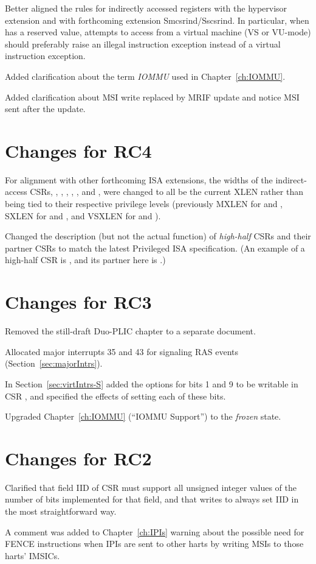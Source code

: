 Better aligned the rules for indirectly accessed registers with the
hypervisor extension and with forthcoming extension Smcsrind/Sscsrind.
In particular, when  has a reserved value, attempts
to access  from a virtual machine (VS or \mbox{VU-mode})
should preferably raise an illegal instruction exception
instead of a virtual instruction exception.

Added clarification about the term \emph{\mbox{IOMMU}}
used in Chapter~\ref{ch:IOMMU}.

Added clarification about MSI write replaced by MRIF update and
notice MSI sent after the update.

\section*{Changes for RC4}

For alignment with other forthcoming {\RISCV} ISA extensions,
the widths of the indirect-access CSRs, , ,
, , , and , were
changed to all be the current XLEN rather than being tied to
their respective privilege levels (previously MXLEN for
 and , SXLEN for  and ,
and VSXLEN for  and ).

Changed the description (but not the actual function)
of \emph{high-half} CSRs and their partner CSRs
to match the latest {\RISCV} Privileged ISA specification.
(An example of a high-half CSR is ,
and its partner here is .)

\section*{Changes for RC3}

Removed the still-draft Duo-PLIC chapter to a separate document.

Allocated major interrupts 35 and 43 for signaling RAS events
(Section~\ref{sec:majorIntrs}).

In Section~\ref{sec:virtIntrs-S} added the options
for bits 1 and 9 to be writable in CSR ,
and specified the effects of setting each of these bits.

Upgraded Chapter~\ref{ch:IOMMU} (``IOMMU Support'')
to the \emph{frozen} state.

\section*{Changes for RC2}

Clarified that
field IID of CSR  must support all
unsigned integer values of the number of bits implemented
for that field, and that writes to 
always set IID in the most straightforward way.

A comment was added to Chapter~\ref{ch:IPIs} warning about
the possible need for FENCE instructions when IPIs are
sent to other harts by writing MSIs to those harts' IMSICs.

